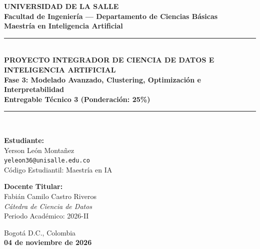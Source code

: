 \documentclass[11pt,letterpaper]{article}
\begin{document}
\begin{titlepage}
    \centering
    \vspace*{0.5cm}
    {\huge \textbf{\textcolor{lasalleblue}{UNIVERSIDAD DE LA SALLE}}}\\[0.3cm]
    {\large \textbf{Facultad de Ingeniería — Departamento de Ciencias Básicas}}\\[0.2cm]
    {\large \textbf{Maestría en Inteligencia Artificial}}\\[1.8cm]

    \rule{\linewidth}{1.5pt}\\[0.4cm]
    {\LARGE \textbf{\textcolor{lasalleblue}{PROYECTO INTEGRADOR DE CIENCIA DE DATOS E INTELIGENCIA ARTIFICIAL}}}\\[0.3cm]
    {\Large \textbf{Fase 3: Modelado Avanzado, Clustering, Optimización e Interpretabilidad}}\\[0.2cm]
    {\normalsize \textbf{Entregable Técnico 3 (Ponderación: 25\%)}}\\[0.4cm]
    \rule{\linewidth}{1.5pt}\\[2.0cm]

    \begin{minipage}[t]{0.48\textwidth}
        \textbf{Estudiante:}\\
        Yerson León Montañez\\
        \texttt{yeleon36@unisalle.edu.co}\\
        Código Estudiantil: Maestría en IA
    \end{minipage}
    \hfill
    \begin{minipage}[t]{0.48\textwidth}
        \begin{flushright}
            \textbf{Docente Titular:}\\
            Fabián Camilo Castro Riveros\\
            \textit{Cátedra de Ciencia de Datos}\\
            Periodo Académico: 2026-II
        \end{flushright}
    \end{minipage}

    \vfill
    {\large Bogotá D.C., Colombia\\ \textbf{04 de noviembre de 2026}}
\end{titlepage}

\newpage
\tableofcontents
\newpage

\end{document}
